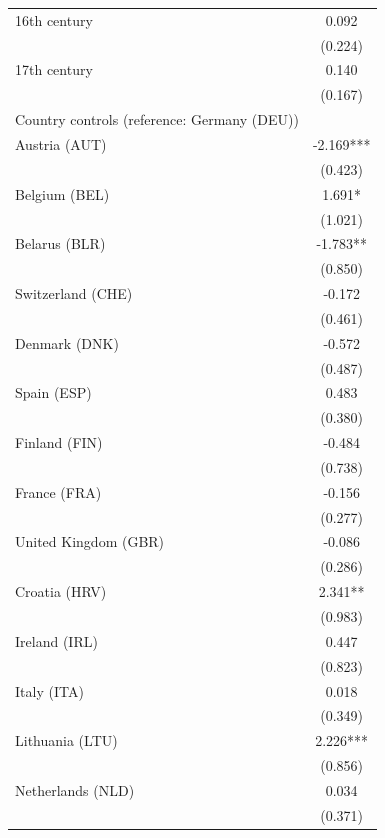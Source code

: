 \begin{center}
\begin{longtable}{l c}
16th century
& 0.092 \\
& (0.224) \\

17th century
& 0.140 \\
& (0.167) \\

\midrule
Country controls (reference: Germany (DEU)) \\
\midrule

Austria (AUT)
& -2.169*** \\
& (0.423) \\

Belgium (BEL)
& 1.691* \\
& (1.021) \\

Belarus (BLR)
& -1.783** \\
& (0.850) \\

Switzerland (CHE)
& -0.172 \\
& (0.461) \\

Denmark (DNK)
& -0.572 \\
& (0.487) \\

Spain (ESP)
& 0.483 \\
& (0.380) \\

Finland (FIN)
& -0.484 \\
& (0.738) \\

France (FRA)
& -0.156 \\
& (0.277) \\

United Kingdom (GBR)
& -0.086 \\
& (0.286) \\

Croatia (HRV)
& 2.341** \\
& (0.983) \\

Ireland (IRL)
& 0.447 \\
& (0.823) \\

Italy (ITA)
& 0.018 \\
& (0.349) \\

Lithuania (LTU)
& 2.226*** \\
& (0.856) \\

Netherlands (NLD)
& 0.034 \\
& (0.371) \\


\end{longtable}
\end{center}
